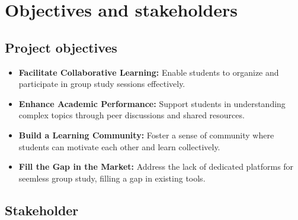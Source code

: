 \chapter{Objectives and stakeholders}

\section{Project objectives}
\label{sect:objectives}

\begin{itemize}
    \item \textbf{Facilitate Collaborative Learning:} Enable students to organize and participate in group study sessions effectively.
    \item \textbf{Enhance Academic Performance:} Support students in understanding complex topics through peer discussions and shared resources.
    \item \textbf{Build a Learning Community:} Foster a sense of community where students can motivate each other and learn collectively.
    \item \textbf{Fill the Gap in the Market:} Address the lack of dedicated platforms for seemless group study, filling a gap in existing tools.
\end{itemize}

\section{Stakeholder}
\label{sect:stakeholder}


